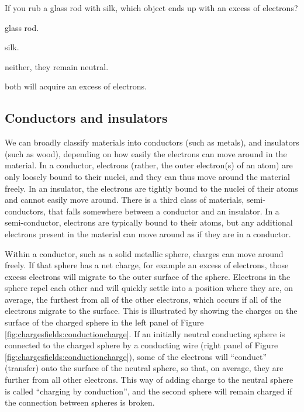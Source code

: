 
\begin{checkpoint}\label{cp:chargesfields:tribo}
\begin{MCquestion}{If you rub a glass rod with silk, which object ends up with an excess of electrons?}
\item glass rod.
\item silk. \correct
\item neither, they remain neutral.
\item both will acquire an excess of electrons.
\end{MCquestion}
\end{checkpoint}

\subsection{Conductors and insulators}
We can broadly classify materials into conductors (such as metals), and insulators (such as wood), depending on how easily the electrons can move around in the material. In a conductor, electrons (rather, the outer electron(s) of an atom) are only loosely bound to their nuclei, and they can thus move around the material freely. In an insulator, the electrons are tightly bound to the nuclei of their atoms and cannot easily move around. There is a third class of materials, semi-conductors, that falls somewhere between a conductor and an insulator. In a semi-conductor, electrons are typically bound to their atoms, but any additional electrons present in the material can move around as if they are in a conductor. 

Within a conductor, such as a solid metallic sphere, charges can move around freely. If that sphere has a net charge, for example an excess of electrons, those excess electrons will migrate to the outer surface of the sphere. Electrons in the sphere repel each other and will quickly settle into a position where they are, on average, the furthest from all of the other electrons, which occurs if all of the electrons migrate to the surface. This is illustrated by showing the charges on the surface of the charged sphere in the left panel of Figure \ref{fig:chargesfields:conductioncharge}. If an initially neutral conducting sphere is connected to the charged sphere by a conducting wire (right panel of Figure \ref{fig:chargesfields:conductioncharge}), some of the electrons will ``conduct'' (transfer) onto the surface of the neutral sphere, so that, on average, they are further from all other electrons. This way of adding charge to the neutral sphere is called ``charging by conduction'', and the second sphere will remain charged if the connection between spheres is broken.

